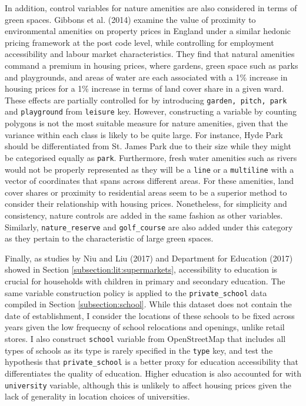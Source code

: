 \documentclass{article}
\begin{document}
In addition, control variables for nature amenities are also considered in terms of green spaces. Gibbons et al. (2014) examine the value of proximity to environmental amenities on property prices in England under a similar hedonic pricing framework at the post code level, while controlling for employment accessibility and labour market characteristics. They find that natural amenities command a premium in housing prices, where gardens, green space such as parks and playgrounds, and areas of water are each associated with a 1\% increase in housing prices for a 1\% increase in terms of land cover share in a given ward.
These effects are partially controlled for by introducing \texttt{garden, pitch, park} and \texttt{playground} from \texttt{leisure} key. However, constructing a variable by counting polygons is not the most suitable measure for nature amenities, given that the variance within each class is likely to be quite large. For instance, Hyde Park should be differentiated from St. James Park due to their size while they might be categorised equally as \texttt{park}. Furthermore, fresh water amenities such as rivers would not be properly represented as they will be a \texttt{line} or a \texttt{multiline} with a vector of coordinates that spans across different areas. For these amenities, land cover shares or proximity to residential areas seem to be a superior method to consider their relationship with housing prices. Nonetheless, for simplicity and consistency, nature controls are added in the same fashion as other variables. Similarly, \texttt{nature\_reserve} and \texttt{golf\_course} are also added under this category as they pertain to the characteristic of large green spaces.

Finally, as studies by Niu and Liu (2017) and Department for Education (2017) showed in Section \ref{subsection:lit:supermarkets}, accessibility to education is crucial for households with children in primary and secondary education. The same variable construction policy is applied to the \texttt{private\_school} data compiled in Section \ref{subsection:school}. While this dataset does not contain the date of establishment, I consider the locations of these schools to be fixed across years given the low frequecny of school relocations and openings, unlike retail stores. I also construct \texttt{school} variable from OpenStreetMap that includes all types of schools as its type is rarely specified in the \texttt{type} key, and test the hypothesis that \texttt{private\_school} is a better proxy for education accessibility that differentiates the quality of education. Higher education is also accounted for with \texttt{university} variable, although this is unlikely to affect housing prices given the lack of generality in location choices of universities.
\end{document}
